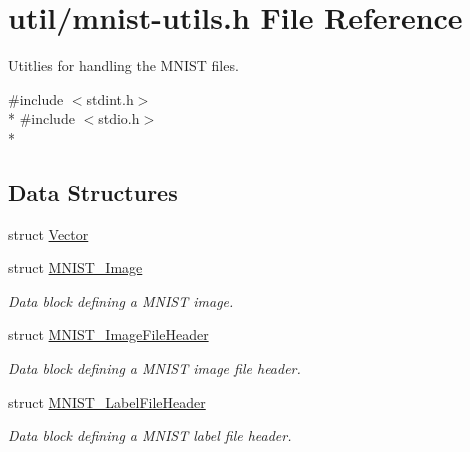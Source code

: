 \hypertarget{mnist-utils_8h}{}\section{util/mnist-\/utils.h File Reference}
\label{mnist-utils_8h}


Utitlies for handling the M\+N\+I\+S\+T files.  


{\ttfamily \#include $<$stdint.\+h$>$}\\*
{\ttfamily \#include $<$stdio.\+h$>$}\\*
\subsection*{Data Structures}
\begin{DoxyCompactItemize}
\item 
struct \hyperlink{struct_vector}{Vector}
\item 
struct \hyperlink{struct_m_n_i_s_t___image}{M\+N\+I\+S\+T\+\_\+\+Image}
\begin{DoxyCompactList}\small\item\em Data block defining a M\+N\+I\+S\+T image. \end{DoxyCompactList}\item 
struct \hyperlink{struct_m_n_i_s_t___image_file_header}{M\+N\+I\+S\+T\+\_\+\+Image\+File\+Header}
\begin{DoxyCompactList}\small\item\em Data block defining a M\+N\+I\+S\+T image file header. \end{DoxyCompactList}\item 
struct \hyperlink{struct_m_n_i_s_t___label_file_header}{M\+N\+I\+S\+T\+\_\+\+Label\+File\+Header}
\begin{DoxyCompactList}\small\item\em Data block defining a M\+N\+I\+S\+T label file header. \end{DoxyCompactList}\end{DoxyCompactItemize}

